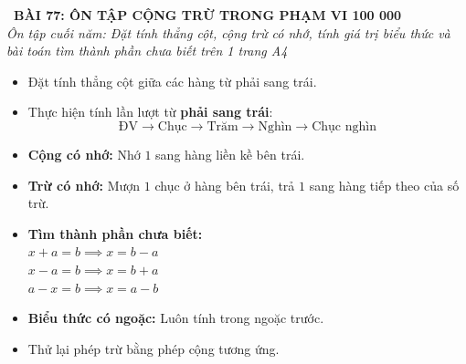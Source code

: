 \documentclass[11pt,a4paper]{article}
\begin{document}
\begin{tcolorbox}[
  enhanced,
  colback=white,
  colframe=primary,
  arc=3mm,
  boxrule=1.2pt,
  left=4mm, right=4mm, top=2.5mm, bottom=2.5mm,
  drop shadow=black!10!white
]
  \centering
  {\Large\bfseries\color{primary}\faBookmark\ BÀI 77: ÔN TẬP CỘNG TRỪ TRONG PHẠM VI 100 000}\\[1.5mm]
  {\small\itshape\color{black!75}Ôn tập cuối năm: Đặt tính thẳng cột, cộng trừ có nhớ, tính giá trị biểu thức và bài toán tìm thành phần chưa biết trên 1 trang A4}
\end{tcolorbox}

\vspace{-2mm}


\noindent
\begin{minipage}[t]{0.49\textwidth}\vspace{0pt}
\begin{tcolorbox}[
  enhanced,
  colback=blue!4!white,
  colframe=blue!75!black,
  arc=2mm, boxrule=0.8pt,
  left=2mm, right=2mm, top=1.8mm, bottom=1.8mm,
  title={\footnotesize\bfseries\color{white}\faCalculator\ 1. Quy tắc cộng và trừ}
]
{\footnotesize
\begin{itemize}\setlength{\itemsep}{1.5pt}\setlength{\leftskip}{-2.5mm}
  \item Đặt tính thẳng cột giữa các hàng từ phải sang trái.
  \item Thực hiện tính lần lượt từ \textbf{phải sang trái}:
  $$\text{ĐV} \to \text{Chục} \to \text{Trăm} \to \text{Nghìn} \to \text{Chục nghìn}$$
  \item \textbf{Cộng có nhớ:} Nhớ $1$ sang hàng liền kề bên trái.
  \item \textbf{Trừ có nhớ:} Mượn $1$ chục ở hàng bên trái, trả $1$ sang hàng tiếp theo của số trừ.
\end{itemize}
}
\end{tcolorbox}
\end{minipage}
\hfill
\begin{minipage}[t]{0.49\textwidth}\vspace{0pt}
\begin{tcolorbox}[
  enhanced,
  colback=teal!4!white,
  colframe=teal!75!black,
  arc=2mm, boxrule=0.8pt,
  left=2mm, right=2mm, top=1.8mm, bottom=1.8mm,
  title={\footnotesize\bfseries\color{white}\faSliders\ 2. Kĩ năng giải toán tổng hợp}
]
{\footnotesize
\begin{itemize}\setlength{\itemsep}{1.5pt}\setlength{\leftskip}{-2.5mm}
  \item \textbf{Tìm thành phần chưa biết:}\\
  $x + a = b \implies x = b - a$\\
  $x - a = b \implies x = b + a$\\
  $a - x = b \implies x = a - b$
  \item \textbf{Biểu thức có ngoặc:} Luôn tính trong ngoặc trước.
  \item Thử lại phép trừ bằng phép cộng tương ứng.
\end{itemize}
}
\end{tcolorbox}
\end{minipage}
\end{document}
